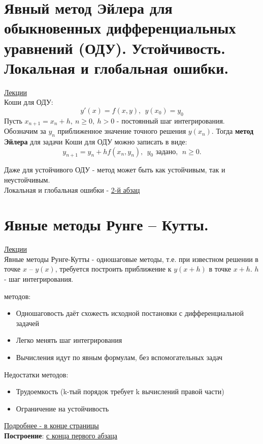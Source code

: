 \documentclass[specialist, subf, href, colorlinks=true, 12pt, times, mtpro, final]{disser}
\theoremstyle{definition}
\begin{document}
{    

\section {Явный метод Эйлера для обыкновенных дифференциальных уравнений (ОДУ). Устойчивость. Локальная и глобальная ошибки.}
    \hyperlink {lects.87}{Лекции}\\
    { Коши} для ОДУ: 
    $$y'(x)=f(x,y),\ \  y(x_0) = y_0$$
    Пусть $x_{n+1} = x_n + h,\  n \geq 0,\  h > 0$ - постоянный шаг интегрирования. Обозначим за $y_n$ приближенное значение точного решения $y(x_n)$. Тогда {\bf метод Эйлера} для задачи Коши для ОДУ можно записать в виде:
$$
    y_{n+1} = y_n + h f(x_n, y_n),\ \  y_0 \text{ задано},\ \  n \geq 0.
$$

Даже для устойчивого ОДУ -  метод может быть как устойчивым, так и неустойчивым.\\
Локальная и глобальная ошибки - \hyperlink {lects.88}{2-й абзац}


\section {Явные методы Рунге -- Кутты.}
    \hyperlink {lects.89}{Лекции}\\
    
    Явные методы Рунге-Кутты - одношаговые методы, т.е. при известном решении в точке $x$ \--- $y(x)$, требуется построить приближение к $y(x+h)$ в точке $x+h$. $h$ - шаг интегрирования.
    
     методов:
    \begin{itemize}
    \item Одношаговость даёт схожесть исходной постановки с дифференциальной задачей
    \item Легко менять шаг интегрирования
    \item Вычисления идут по явным формулам, без вспомогательных задач
    \end{itemize}
    Недостатки методов:
    \begin{itemize}
    \item Трудоемкость (k-тый порядок требует k вычислений правой части)
    \item Ограничение на устойчивость 
    \end{itemize}
    \hyperlink {lects.90}{Подробнее - в конце страницы}\\

    \noindent\textbf{Построение}: \hyperlink {lects.89}{с конца первого абзаца}\\

}
\end{document}
